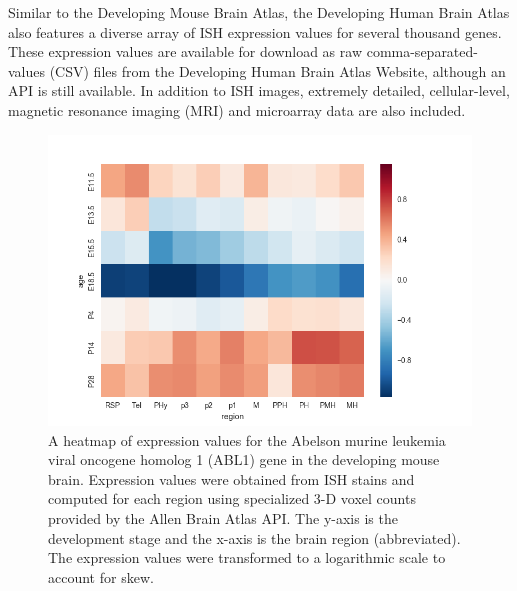 \documentclass[12pt,oneside,onecolumn,a4paper]{article}
\begin{document}
Similar to the Developing Mouse Brain Atlas, the Developing Human Brain Atlas also features a diverse array of ISH expression values for several thousand genes. These expression values are available for download as raw comma-separated-values (CSV) files from the Developing Human Brain Atlas Website, although an API is still available. In addition to ISH images, extremely detailed, cellular-level, magnetic resonance imaging (MRI) and microarray data are also included. \citep{24695229}

\begin{figure}[h!]
\begin{center}
\includegraphics[width=0.8\columnwidth]{figures/Abl1/Abl1}
\caption{A heatmap of expression values for the Abelson murine leukemia viral oncogene homolog 1 (ABL1) gene in the developing mouse brain. Expression values were obtained from ISH stains and computed for each region using specialized 3-D voxel counts provided by the Allen Brain Atlas API. The y-axis is the development stage and the x-axis is the brain region (abbreviated). The expression values were transformed to a logarithmic scale to account for skew.%
}
\end{center}
\end{figure}
\end{document}
